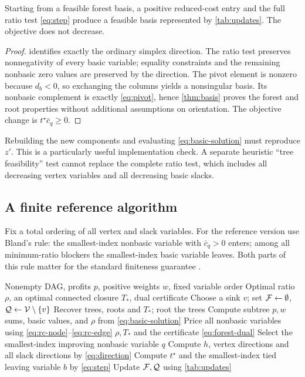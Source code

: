 \begin{theorem}\label{thm:pivot}
Starting from a feasible forest basis, a positive reduced-cost entry and
the full ratio test \eqref{eq:step} produce a feasible basis represented
by \cref{tab:updates}. The objective does not decrease.
\end{theorem}
\begin{proof}
 identifies exactly the ordinary simplex direction.
The ratio test preserves nonnegativity of every basic variable; equality
constraints and the remaining nonbasic zero values are preserved by the
direction. The pivot element is nonzero because $d_b<0$, so exchanging
the columns yields a nonsingular basis. Its nonbasic complement is exactly
\eqref{eq:pivot}, hence \cref{thm:basis} proves the forest and root
properties without additional assumptions on orientation. The objective
change is $t^\star\bar c_q\ge0$.
\end{proof}

Rebuilding the new components and evaluating \eqref{eq:basic-solution}
must reproduce $z'$. This is a particularly useful implementation check.
A separate heuristic ``tree feasibility'' test cannot replace the complete
ratio test, which includes all decreasing vertex variables and all decreasing
basic slacks.

\subsection{A finite reference algorithm}
Fix a total ordering of all vertex and slack variables. For the reference
version use Bland's rule: the smallest-index nonbasic variable with
$\bar c_q>0$ enters; among all minimum-ratio blockers the smallest-index
basic variable leaves. Both parts of this rule matter for the standard
finiteness guarantee \citep{Bland1977}.

\begin{algorithm}[htbp]
\caption{\FSC{} ratio oracle, exact-arithmetic reference}
\label{alg:forest}
\begin{algorithmic}[1]
\Require Nonempty DAG, profits $p$, positive weights $w$, fixed variable order
\Ensure Optimal ratio $\rho$, an optimal connected closure $T_*$, dual certificate
\State Choose a sink $v$; set $\mathcal F\gets\emptyset$, $\mathcal Q\gets\mathcal V\setminus\{v\}$
\Loop
  \State Recover trees, roots and $T_*$; root the trees
  \State Compute subtree $p,w$ sums, basic values, and $\rho$ from \eqref{eq:basic-solution}
  \State Price all nonbasic variables using \eqref{eq:rc-node}--\eqref{eq:rc-edge}
    \State \Return $\rho,T_*$ and the certificate \eqref{eq:forest-dual}
  \EndIf
  \State Select the smallest-index improving nonbasic variable $q$
  \State Compute $h$, vertex directions and all slack directions by \eqref{eq:direction}
  \State Compute $t^\star$ and the smallest-index tied leaving variable $b$ by \eqref{eq:step}
  \State Update $\mathcal F,\mathcal Q$ using \cref{tab:updates}
\EndLoop
\end{algorithmic}
\end{algorithm}

